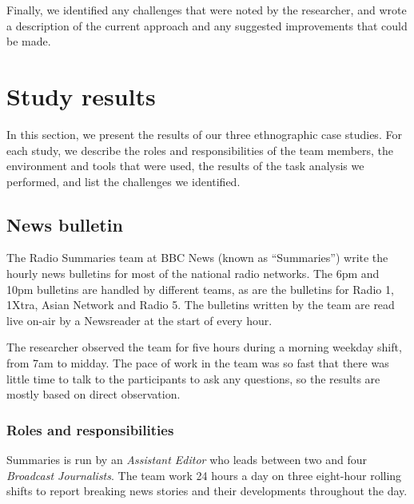Finally, we identified any challenges that were noted by the researcher, and wrote a description of the current
approach and any suggested improvements that could be made.

\section{Study results}\label{sec:ethno-results}

In this section, we present the results of our three ethnographic case studies. For each study, we describe the roles
and responsibilities of the team members, the environment and tools that were used, the results of the task analysis we
performed, and list the challenges we identified.


\subsection{News bulletin}\label{sec:news}
The Radio Summaries team at BBC News (known as ``Summaries'') write the hourly news bulletins for most of the national
radio networks. The 6pm and 10pm bulletins are handled by different teams, as are the bulletins for Radio 1, 1Xtra,
Asian Network and Radio 5.  The bulletins written by the team are read live on-air by a Newsreader at the start of
every hour.

The researcher observed the team for five hours during a morning weekday shift, from 7am to midday. The pace of work in
the team was so fast that there was little time to talk to the participants to ask any questions, so the results are
mostly based on direct observation.

\subsubsection{Roles and responsibilities}\label{sec:news-roles}
Summaries is run by an \textit{Assistant Editor} who leads between two and four \textit{Broadcast Journalists}. The
team work 24 hours a day on three eight-hour rolling shifts to report breaking news stories and their developments
throughout the day.

